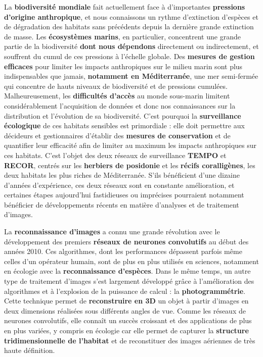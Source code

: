 La \textbf{biodiversité mondiale} fait actuellement face à d’importantes \textbf{pressions d’origine anthropique}, et nous connaissons un rythme d’extinction d’espèces et de dégradation des habitats sans précédents depuis la dernière grande extinction de masse. Les \textbf{écosystèmes marins}, en particulier, concentrent une grande partie de la biodiversité \textbf{dont nous dépendons} directement ou indirectement, et souffrent du cumul de ces pressions à l’échelle globale. Des \textbf{mesures de gestion efficaces} pour limiter les impacts anthropiques sur le milieu marin sont plus indispensables que jamais, \textbf{notamment en Méditerranée}, une mer semi-fermée qui concentre de hauts niveaux de biodiversité et de pressions cumulées. Malheureusement, les \textbf{difficultés d’accès} au monde sous-marin limitent considérablement l’acquisition de données et donc nos connaissances sur la distribution et l’évolution de sa biodiversité. C’est pourquoi la \textbf{surveillance écologique} de ces habitats sensibles est primordiale : elle doit permettre aux décideurs et gestionnaires d’établir des \textbf{mesures de conservation} et de quantifier leur efficacité afin de limiter au maximum les impacts anthropiques sur ces habitats. C’est l’objet des deux réseaux de surveillance \textbf{TEMPO} et \textbf{RECOR}, centrés sur les \textbf{herbiers de posidonie} et les \textbf{récifs coralligènes}, les deux habitats les plus riches de Méditerranée. S’ils bénéficient d’une dizaine d’années d’expérience, ces deux réseaux sont en constante amélioration, et certaines étapes aujourd’hui fastidieuses ou imprécises pourraient notamment bénéficier de développements récents en matière d’analyses et de traitement d’images.

La \textbf{reconnaissance d’images} a connu une grande révolution avec le développement des premiers \textbf{réseaux de neurones convolutifs} au début des années 2010. Ces algorithmes, dont les performances dépassent parfois même celles d’un opérateur humain, sont de plus en plus utilisés en sciences, notamment en écologie avec la \textbf{reconnaissance d’espèces}. Dans le même temps, un autre type de traitement d’images s’est largement développé grâce à l’amélioration des algorithmes et à l’explosion de la puissance de calcul : la \textbf{photogrammétrie}. Cette technique permet de \textbf{reconstruire en 3D} un objet à partir d’images en deux dimensions réalisées sous différents angles de vue. Comme les réseaux de neurones convolutifs, elle connaît un succès croissant et des applications de plus en plus variées, y compris en écologie car elle permet de capturer la \textbf{structure tridimensionnelle de l’habitat} et de reconstituer des images aériennes de très haute définition.

